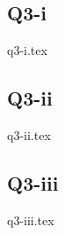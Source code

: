 \documentclass[crop=false,fleqn]{standalone}
\begin{document}
    \subsection*{Q3-i}
    {q3-i.tex}

    \subsection*{Q3-ii}
    {q3-ii.tex}

    \subsection*{Q3-iii}
    {q3-iii.tex}
\end{document}
